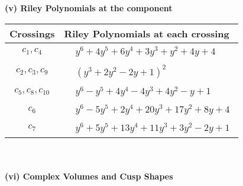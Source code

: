 \documentclass[1p]{elsarticle_modified}
\theoremstyle{definition}
\begin{document}
\newpage\renewcommand{\arraystretch}{1}
\flushleft \textbf{(v) Riley Polynomials at the component}\newline \\
\begin{tabular}{m{50pt}|m{274pt}}
Crossings & \hspace{64pt}Riley Polynomials at each crossing \\
\hline $$\begin{aligned}c_{1},c_{4}\end{aligned}$$&$\begin{aligned}
&y^6+4 y^5+6 y^4+3 y^3+y^2+4 y+4
\end{aligned}$\\
\hline $$\begin{aligned}c_{2},c_{3},c_{9}\end{aligned}$$&$\begin{aligned}
&(y^3+2 y^2-2 y+1)^2
\end{aligned}$\\
\hline $$\begin{aligned}c_{5},c_{8},c_{10}\end{aligned}$$&$\begin{aligned}
&y^6- y^5+4 y^4-4 y^3+4 y^2- y+1
\end{aligned}$\\
\hline $$\begin{aligned}c_{6}\end{aligned}$$&$\begin{aligned}
&y^6-5 y^5+2 y^4+20 y^3+17 y^2+8 y+4
\end{aligned}$\\
\hline $$\begin{aligned}c_{7}\end{aligned}$$&$\begin{aligned}
&y^6+5 y^5+13 y^4+11 y^3+3 y^2-2 y+1
\end{aligned}$\\
\hline
\end{tabular}\\~\\
\newpage\flushleft \textbf{(vi) Complex Volumes and Cusp Shapes}
\end{document}
